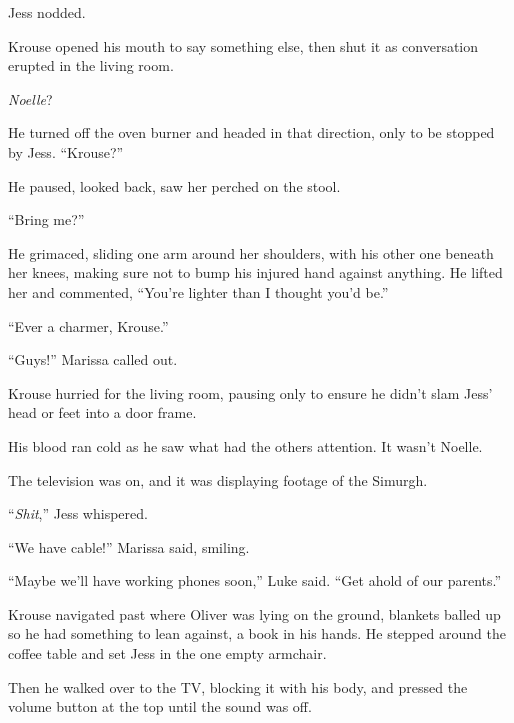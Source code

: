 Jess nodded.



Krouse opened his mouth to say something else, then shut it as conversation erupted in the living room.



\emph{Noelle}?



He turned off the oven burner and headed in that direction, only to be stopped by Jess.  ``Krouse?''



He paused, looked back, saw her perched on the stool.



``Bring me?''



He grimaced, sliding one arm around her shoulders, with his other one beneath her knees, making sure not to bump his injured hand against anything.  He lifted her and commented, ``You're lighter than I thought you'd be.''



``Ever a charmer, Krouse.''



``Guys!''  Marissa called out.



Krouse hurried for the living room, pausing only to ensure he didn't slam Jess' head or feet into a door frame.



His blood ran cold as he saw what had the others attention.  It wasn't Noelle.



The television was on, and it was displaying footage of the Simurgh.



``\emph{Shit},'' Jess whispered.



``We have cable!'' Marissa said, smiling.



``Maybe we'll have working phones soon,'' Luke said.  ``Get ahold of our parents.''



Krouse navigated past where Oliver was lying on the ground, blankets balled up so he had something to lean against, a book in his hands.  He stepped around the coffee table and set Jess in the one empty armchair.



Then he walked over to the TV, blocking it with his body, and pressed the volume button at the top until the sound was off.



